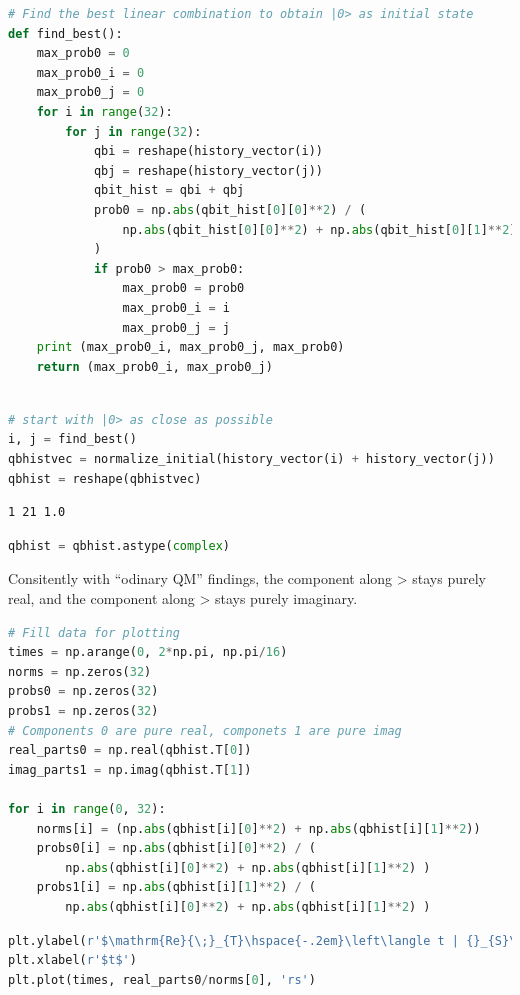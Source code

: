\begin{lstlisting}[language=Python]
# Find the best linear combination to obtain |0> as initial state
def find_best():
    max_prob0 = 0
    max_prob0_i = 0
    max_prob0_j = 0
    for i in range(32):
        for j in range(32):
            qbi = reshape(history_vector(i))
            qbj = reshape(history_vector(j))
            qbit_hist = qbi + qbj
            prob0 = np.abs(qbit_hist[0][0]**2) / (
                np.abs(qbit_hist[0][0]**2) + np.abs(qbit_hist[0][1]**2)
            )
            if prob0 > max_prob0:
                max_prob0 = prob0
                max_prob0_i = i
                max_prob0_j = j
    print (max_prob0_i, max_prob0_j, max_prob0)
    return (max_prob0_i, max_prob0_j)
    
\end{lstlisting}

\begin{lstlisting}[language=Python]
# start with |0> as close as possible
i, j = find_best()
qbhistvec = normalize_initial(history_vector(i) + history_vector(j))
qbhist = reshape(qbhistvec) 
\end{lstlisting}

\begin{lstlisting}
1 21 1.0
\end{lstlisting}

\begin{lstlisting}[language=Python]
qbhist = qbhist.astype(complex)
\end{lstlisting}

Consitently with ``odinary QM'' findings, the component along
\textgreater{} stays purely real, and the component along
\textgreater{} stays purely imaginary.

\begin{lstlisting}[language=Python]
# Fill data for plotting
times = np.arange(0, 2*np.pi, np.pi/16)
norms = np.zeros(32)
probs0 = np.zeros(32)
probs1 = np.zeros(32)
# Components 0 are pure real, componets 1 are pure imag
real_parts0 = np.real(qbhist.T[0])
imag_parts1 = np.imag(qbhist.T[1])

for i in range(0, 32):
    norms[i] = (np.abs(qbhist[i][0]**2) + np.abs(qbhist[i][1]**2))
    probs0[i] = np.abs(qbhist[i][0]**2) / (
        np.abs(qbhist[i][0]**2) + np.abs(qbhist[i][1]**2) )
    probs1[i] = np.abs(qbhist[i][1]**2) / (
        np.abs(qbhist[i][0]**2) + np.abs(qbhist[i][1]**2) )
\end{lstlisting}

\begin{lstlisting}[language=Python]
plt.ylabel(r'$\mathrm{Re}{\;}_{T}\hspace{-.2em}\left\langle t | {}_{S}\hspace{-.2em}\left\langle 0 | \Psi \right\rangle\hspace{-.17em}\right\rangle $')
plt.xlabel(r'$t$')
plt.plot(times, real_parts0/norms[0], 'rs')
\end{lstlisting}

